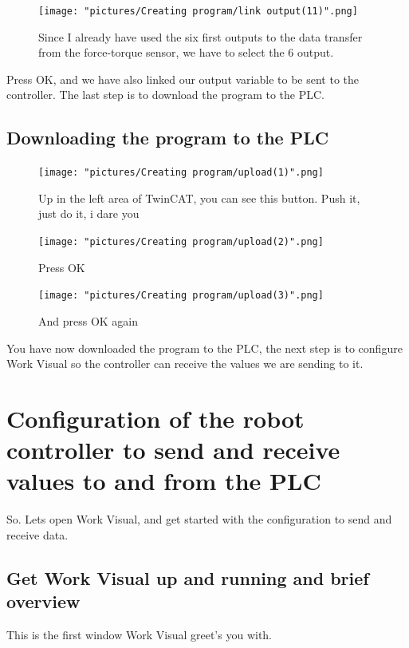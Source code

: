 \documentclass{article}
\begin{document}
\begin{figure}[h!]
    \centering
    \texttt{[image: "pictures/Creating program/link output(11)".png]}
    \caption{Since I already have used the six first outputs to the data transfer from the force-torque sensor, we have to select the 6 output.}
    \label{fig:my_label}
\end{figure}

Press OK, and we have also linked our output variable to be sent to the controller. The last step is to download the program to the PLC.

\newpage

\subsection{Downloading the program to the PLC}



\begin{figure}[h!]
    \centering
    \texttt{[image: "pictures/Creating program/upload(1)".png]}
    \caption{Up in the left area of TwinCAT, you can see this button. Push it, just do it, i dare you}
    \label{fig:my_label}
\end{figure}

\begin{figure}[h!]
    \centering
    \texttt{[image: "pictures/Creating program/upload(2)".png]}
    \caption{Press OK}
    \label{fig:my_label}
\end{figure}

\begin{figure}[h!]
    \centering
    \texttt{[image: "pictures/Creating program/upload(3)".png]}
    \caption{And press OK again}
    \label{fig:my_label}
\end{figure}

You have now downloaded the program to the PLC, the next step is to configure Work Visual so the controller can receive the values we are sending to it.

\newpage

\section{Configuration of the robot controller to send and receive values to and from the PLC}
So. Lets open Work Visual, and get started with the configuration to send and receive data. 

\subsection{Get Work Visual up and running and brief overview}
This is the first window Work Visual greet's you with. 
\end{document}
